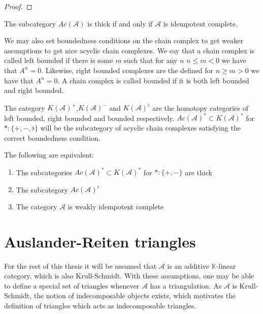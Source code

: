     \begin{proof}
        
    \end{proof}

    \begin{corollary}
        The subcategory $Ac(\mathcal{A})$ is thick if and only if $\mathcal{A}$ is idempotent complete.
    \end{corollary}

     We may also set boundedness conditions on the chain complex to get weaker assumptions to get nice acyclic chain complexes. We say that a chain complex is called left bounded if there is some $m$ such that for any $n$ $n\leq m<0$ we have that $A^n = 0$. Likewise, right bounded complexes are the defined for $n\geq m>0$ we have that $A^n=0$. A chain complex is called bounded if it is both left bounded and right bounded. 

    \begin{definition}
        The category $K(\mathcal{A})^+$,$K(\mathcal{A})^-$ and $K(\mathcal{A})^{\flat}$ are the homotopy categories of left bounded, right bounded and bounded respectively. $Ac(\mathcal{A})^* \subset K(\mathcal{A})^*$ for $*:\{+,-,\flat\}$ will be the subcategory of acyclic chain complexes satisfying the correct boundedness condition.
    \end{definition}

    \begin{lemma}
        The following are equivalent:
        \begin{enumerate}
            \item The subcategories $Ac(\mathcal{A})^* \subset K(\mathcal{A})^*$ for $*:\{+,-\}$ are thick
            \item The subcategory $Ac(\mathcal{A})^{\flat}$
            \item The category $\mathcal{A}$ is weakly idempotent complete
        \end{enumerate}
    \end{lemma}

\section{Auslander-Reiten triangles}

    For the rest of this thesis it will be assumed that $\mathcal{A}$ is an additive $\mathbb{K}$-linear category, which is also Krull-Schmidt. With these assumptions, one may be able to define a special set of triangles whenever $\mathcal{A}$ has a triangulation. As $\mathcal{A}$ is Krull-Schmidt, the notion of indecomposable objects exists, which motivates the definition of triangles which acts as indecomposable triangles.

